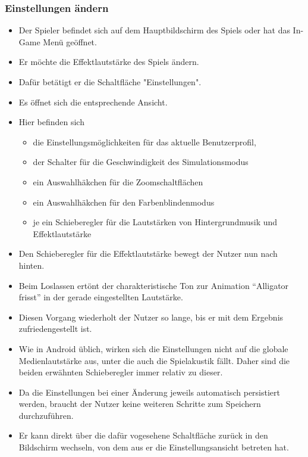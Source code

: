 \subsubsection{Einstellungen ändern}
\begin{itemize}
\item Der Spieler befindet sich auf dem Hauptbildschirm des Spiels oder hat das In-Game Menü 
geöffnet.
\item Er möchte die Effektlautstärke des Spiels ändern.
\item Dafür betätigt er die Schaltfläche "Einstellungen".
\item Es öffnet sich die entsprechende Ansicht.
\item Hier befinden sich
	\begin{itemize}
	\item die Einstellungsmöglichkeiten für das aktuelle Benutzerprofil, 
	\item der Schalter für die Geschwindigkeit des Simulationsmodus
	\item ein Auswahlhäkchen für die Zoomschaltflächen
	\item ein Auswahlhäkchen für den Farbenblindenmodus
	\item je ein Schieberegler für die Lautstärken von Hintergrundmusik und Effektlautstärke
	\end{itemize}
\item Den Schieberegler für die Effektlautstärke bewegt der Nutzer nun nach hinten.
\item Beim Loslassen ertönt der charakteristische Ton zur Animation ``Alligator frisst'' in der
gerade eingestellten Lautstärke.
\item Diesen Vorgang wiederholt der Nutzer so lange, bis er mit dem Ergebnis zufriedengestellt ist.
\item Wie in Android üblich, wirken sich die Einstellungen nicht auf die globale Medienlautstärke
aus, unter die auch die Spielakustik fällt. Daher sind die beiden erwähnten Schieberegler immer relativ zu dieser. 
\item Da die Einstellungen bei einer Änderung jeweils automatisch persistiert werden, braucht der
Nutzer keine weiteren Schritte zum Speichern durchzuführen.
\item Er kann direkt über die dafür vogesehene Schaltfläche zurück in den Bildschirm
wechseln, von dem aus er die Einstellungsansicht betreten hat.
\end{itemize}
